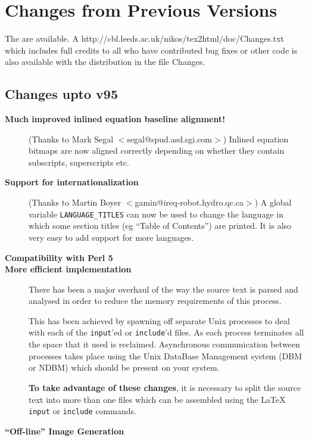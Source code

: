 \section{Changes from Previous Versions}
The 
are available. A 
{http://cbl.leeds.ac.uk/nikos/tex2html/doc/Changes.txt}
which includes full credits to all who have contributed 
bug fixes or other code is also available with the
\latextohtml distribution in the file {\fn Changes}.


\subsection{Changes upto v95}
\begin{description}
\item[{\bf Much improved inlined equation baseline alignment!}]
(Thanks to Mark Segal $<$segal@spud.asd.sgi.com$>$)
Inlined equation bitmaps are now aligned correctly depending 
on whether they contain subscripts, superscripts etc. 
\item[{\bf Support for internationalization}]
(Thanks to Martin Boyer $<$gamin@ireq-robot.hydro.qc.ca$>$)
A global variable {\tt LANGUAGE\_TITLES} can now be used to change the
language in which some section titles (eg ``Table of Contents'') are
printed. It is also very easy to add support for more languages.
\item[{\bf Compatibility with Perl 5}]
\item[{\bf More efficient implementation}]
There has been a major overhaul of the way the source text is parsed
and analysed in order to reduce the memory requirements of this
process.

This has been achieved by spawning off separate Unix processes to deal
with each of the {\tt input}'ed or {\tt include}'d files. As each
process
terminates all the space that it used is reclaimed. 
Asynchronous communication between processes takes place using 
the Unix DataBase Management system (DBM or NDBM) 
which should be present
on your system.

{\bf To take advantage of these changes}, 
it is necessary to split the source text 
into more than one files which can be assembled using the \LaTeX
{\tt input} or {\tt include} commands.


\item[{\bf ``Off-line'' Image Generation}]


\end{description}
